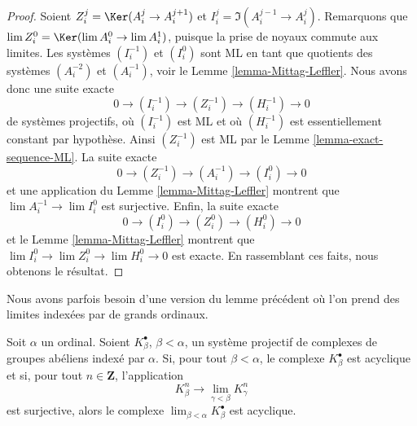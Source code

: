 \begin{proof}
Soient $Z^j_i = \Ker(A^j_i \to A^{j + 1}_i)$ et
$I^j_i = \Im(A^{j - 1}_i \to A^j_i)$.
Remarquons que $\lim Z^0_i = \Ker(\lim A^0_i \to \lim A^1_i)$, puisque
la prise de noyaux commute aux limites.
Les systèmes $(I^{-1}_i)$ et $(I^0_i)$ sont ML en tant que quotients des
systèmes $(A^{-2}_i)$ et $(A^{-1}_i)$, voir le
Lemme \ref{lemma-Mittag-Leffler}.
Nous avons donc une suite exacte
$$
0 \to (I^{-1}_i) \to (Z^{-1}_i) \to (H^{-1}_i) \to 0
$$
de systèmes projectifs, où $(I^{-1}_i)$ est ML et où $(H^{-1}_i)$
est essentiellement constant par hypothèse.
Ainsi $(Z^{-1}_i)$ est ML par le
Lemme \ref{lemma-exact-sequence-ML}.
La suite exacte
$$
0 \to (Z^{-1}_i) \to (A^{-1}_i) \to (I^0_i) \to 0
$$
et une application du
Lemme \ref{lemma-Mittag-Leffler}
montrent que $\lim A^{-1}_i \to \lim I^0_i$ est surjective.
Enfin, la suite exacte
$$
0 \to (I^0_i) \to (Z^0_i) \to (H^0_i) \to 0
$$
et le
Lemme \ref{lemma-Mittag-Leffler}
montrent que $\lim I^0_i \to \lim Z^0_i \to \lim H^0_i \to 0$
est exacte. En rassemblant ces faits, nous obtenons le résultat.
\end{proof}

\noindent
Nous avons parfois besoin d'une version du lemme précédent où l'on prend
des limites indexées par de grands ordinaux.

\begin{lemma}
\label{lemma-ML-over-ordinals}
Soit $\alpha$ un ordinal. Soient $K_\beta^\bullet$, $\beta < \alpha$,
un système projectif de complexes de groupes abéliens indexé par $\alpha$.
Si, pour tout $\beta < \alpha$, le complexe $K_\beta^\bullet$ est acyclique
et si, pour tout $n \in \mathbf{Z}$, l'application
$$
K^n_\beta \longrightarrow \lim_{\gamma < \beta} K^n_\gamma
$$
est surjective, alors le complexe
$\lim_{\beta < \alpha} K_\beta^\bullet$ est acyclique.
\end{lemma}

